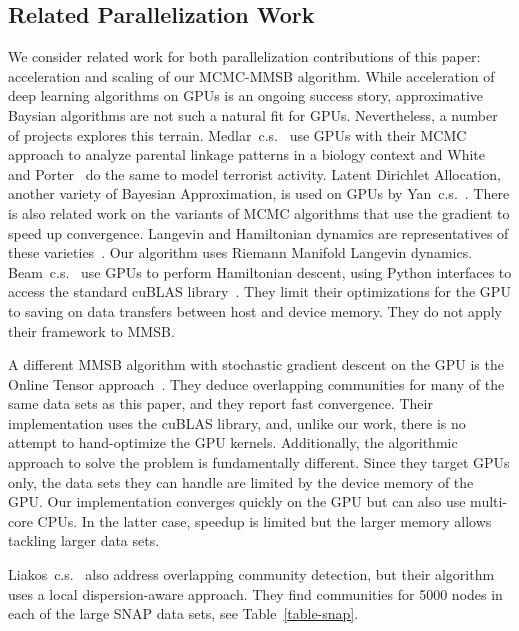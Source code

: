 \subsection{Related Parallelization Work}
\label{sec-related}

We consider related work for both parallelization contributions of this paper: acceleration and scaling
of our MCMC-MMSB algorithm. While acceleration of deep learning algorithms on GPUs
is an ongoing success story, approximative Baysian algorithms are
not such a natural fit for GPUs. Nevertheless, a number of projects explores this terrain.
Medlar~c.s.~\cite{journals/bioinformatics/MedlarGSBK13} use GPUs with their
MCMC approach to analyze parental linkage patterns in a biology context and
White and Porter~\cite{DBLP:journals/csda/WhiteP14} do the same to model terrorist activity.
Latent Dirichlet Allocation, another variety of Bayesian Approximation,
is used on GPUs by Yan~c.s.~\cite{DBLP:conf/nips/YanXQ09}. There is also related
work on the variants of MCMC algorithms that use the gradient to speed
up convergence. Langevin and Hamiltonian dynamics are representatives of
these varieties~\cite{Girolami_riemannmanifold}. Our algorithm uses Riemann
Manifold Langevin dynamics. Beam~c.s.~\cite{beam2014fast} use GPUs to perform
Hamiltonian descent, using Python interfaces to access the standard cuBLAS
library~\cite{cuBLAS}. They limit their optimizations for the GPU to saving
on data transfers between host and device memory. They do not apply their
framework to MMSB.

A different MMSB algorithm with stochastic gradient descent on the GPU is
the Online Tensor approach~\cite{DBLP:journals/corr/HuangNHVA13}. They deduce
overlapping communities for many of the same data sets as this paper, and they
report fast convergence. Their implementation uses the cuBLAS
library, and, unlike our work, there is no attempt to hand-optimize the GPU
kernels. Additionally, the algorithmic approach to solve the problem is
fundamentally different.
Since they target GPUs only, the data sets they
can handle are limited by the device memory of the GPU. Our implementation converges
quickly on the GPU but can also use multi-core CPUs. In the latter case, speedup is
limited but the larger memory allows tackling larger data sets.

Liakos~c.s.~\cite{liakos-bigdata16} also address overlapping community detection, but their
algorithm uses a local dispersion-aware approach. They find communities for 5000
nodes in each of the large SNAP data sets, see Table~\ref{table-snap}.

